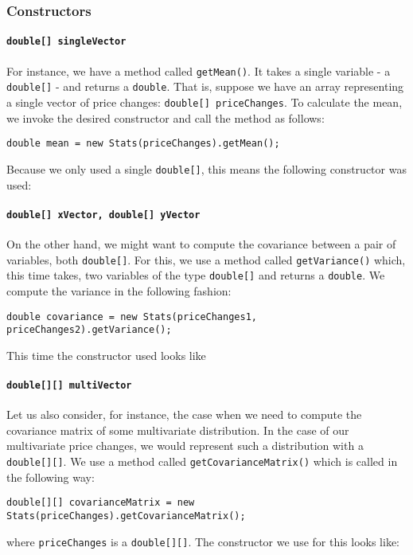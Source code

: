 \documentclass[../Dissertation.tex]{subfiles}
\begin{document}
\subsubsection{Constructors}
\paragraph{\lstinline|double[] singleVector|}

For instance, we have a method called \lstinline|getMean()|.
It takes a single variable - a \lstinline|double[]| - and returns a \lstinline|double|.
That is, suppose we have an array representing a single vector of price changes: \lstinline|double[] priceChanges|.
To calculate the mean, we invoke the desired constructor and call the method as follows:
\begin{center}
\lstinline|double mean = new Stats(priceChanges).getMean();|
\end{center}
Because we only used a single \lstinline|double[]|, this means the following constructor was used:

 
\paragraph{\lstinline|double[] xVector, double[] yVector|}

On the other hand, we might want to compute the covariance between a pair of variables, both \lstinline|double[]|.
For this, we use a method called \lstinline|getVariance()| which, this time takes, two variables of the type \lstinline|double[]| and returns a \lstinline|double|.
We compute the variance in the following fashion:
\begin{center}
\lstinline|double covariance = new Stats(priceChanges1, priceChanges2).getVariance();|
\end{center}
This time the constructor used looks like 


\paragraph{\lstinline|double[][] multiVector|}

Let us also consider, for instance, the case when we need to compute the covariance matrix of some multivariate distribution.
In the case of our multivariate price changes, we would represent such a distribution with a \lstinline|double[][]|.
We use a method called \lstinline|getCovarianceMatrix()| which is called in the following way:
\begin{center}
\lstinline|double[][] covarianceMatrix = new Stats(priceChanges).getCovarianceMatrix();|
\end{center}
where \lstinline|priceChanges| is a \lstinline|double[][]|.
The constructor we use for this looks like:

\end{document}
